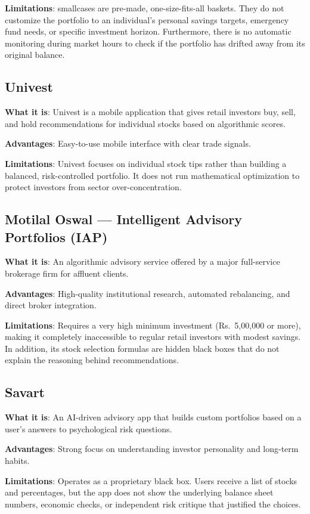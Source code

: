 \textbf{Limitations}: smallcases are pre-made, one-size-fits-all baskets. They do not customize the portfolio to an individual's personal savings targets, emergency fund needs, or specific investment horizon. Furthermore, there is no automatic monitoring during market hours to check if the portfolio has drifted away from its original balance.

\subsection{Univest}
\textbf{What it is}: Univest is a mobile application that gives retail investors buy, sell, and hold recommendations for individual stocks based on algorithmic scores.

\textbf{Advantages}: Easy-to-use mobile interface with clear trade signals.

\textbf{Limitations}: Univest focuses on individual stock tips rather than building a balanced, risk-controlled portfolio. It does not run mathematical optimization to protect investors from sector over-concentration.

\subsection{Motilal Oswal — Intelligent Advisory Portfolios (IAP)}
\textbf{What it is}: An algorithmic advisory service offered by a major full-service brokerage firm for affluent clients.

\textbf{Advantages}: High-quality institutional research, automated rebalancing, and direct broker integration.

\textbf{Limitations}: Requires a very high minimum investment (Rs.~5,00,000 or more), making it completely inaccessible to regular retail investors with modest savings. In addition, its stock selection formulas are hidden black boxes that do not explain the reasoning behind recommendations.

\subsection{Savart}
\textbf{What it is}: An AI-driven advisory app that builds custom portfolios based on a user's answers to psychological risk questions.

\textbf{Advantages}: Strong focus on understanding investor personality and long-term habits.

\textbf{Limitations}: Operates as a proprietary black box. Users receive a list of stocks and percentages, but the app does not show the underlying balance sheet numbers, economic checks, or independent risk critique that justified the choices.

